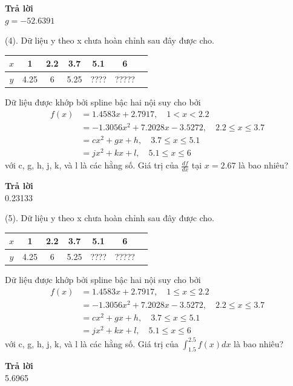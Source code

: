 \textbf{Trả lời} \\
$g=-52.6391$

(4). Dữ liệu y theo x chưa hoàn chỉnh sau đây được cho.
\begin{table}[h]
\centering
\begin{tabular}{|c|c|c|c|c|c|c|}
\hline
$x$ & 1 & 2.2 & 3.7 & 5.1 & 6 \\
\hline
$y$ & 4.25 & 6 & 5.25 & ???? & ????? \\
\hline
\end{tabular}
\end{table}

Dữ liệu được khớp bởi spline bậc hai nội suy cho bởi
\begin{align}
f(x) &= 1.4583x+2.7917, \quad 1 < x < 2.2 \nonumber \\
&= -1.3056x^2+7.2028x-3.5272, \quad 2.2 \le x \le 3.7 \nonumber \\
&= cx^2+gx+h, \quad 3.7 \le x \le 5.1 \nonumber \\
&= jx^2+kx+l, \quad 5.1 \le x \le 6
\end{align}
với c, g, h, j, k, và l là các hằng số. Giá trị của $\frac{df}{dx}$ tại $x=2.67$ là bao nhiêu?

\textbf{Trả lời} \\
0.23133

(5). Dữ liệu y theo x chưa hoàn chỉnh sau đây được cho.
\begin{table}[h]
\centering
\begin{tabular}{|c|c|c|c|c|c|c|}
\hline
$x$ & 1 & 2.2 & 3.7 & 5.1 & 6 \\
\hline
$y$ & 4.25 & 6 & 5.25 & ???? & ????? \\
\hline
\end{tabular}
\end{table}

Dữ liệu được khớp bởi spline bậc hai nội suy cho bởi
\begin{align}
f(x) &= 1.4583x+2.7917, \quad 1 \le x \le 2.2 \nonumber \\
&= -1.3056x^2+7.2028x-3.5272, \quad 2.2 \le x \le 3.7 \nonumber \\
&= cx^2+gx+h, \quad 3.7 \le x \le 5.1 \nonumber \\
&= jx^2+kx+l, \quad 5.1 \le x \le 6
\end{align}
với c, g, h, j, k, và l là các hằng số. Giá trị của $\int_{1.5}^{2.5}f(x)dx$ là bao nhiêu?

\textbf{Trả lời} \\
5.6965

